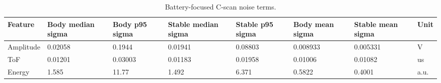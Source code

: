\begin{table}[htbp]
\centering
\caption{Battery-focused C-scan noise terms.}
\label{tab:cscan_battery_focused_noise}
\begin{tabular}{llllllll}
\hline
Feature & Body median sigma & Body p95 sigma & Stable median sigma & Stable p95 sigma & Body mean sigma & Stable mean sigma & Unit \\
\hline
Amplitude & 0.02058 & 0.1944 & 0.01941 & 0.08803 & 0.008933 & 0.005331 & V \\
ToF & 0.01201 & 0.03003 & 0.01183 & 0.01958 & 0.01006 & 0.01082 & us \\
Energy & 1.585 & 11.77 & 1.492 & 6.371 & 0.5822 & 0.4001 & a.u. \\
\hline
\end{tabular}
\end{table}
